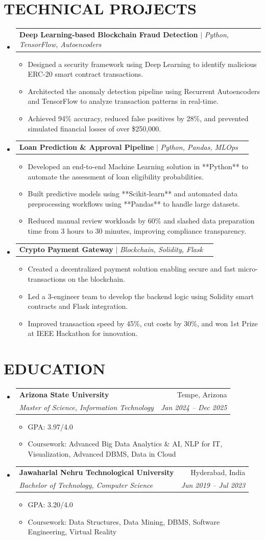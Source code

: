 \documentclass[letterpaper,10pt]{article}
\makeatletter
\newcommand{\resumeItem}[1]{\item\small{{#1 \vspace{-2pt}}}}
\newcommand{\resumeSubheading}[4]{
  \vspace{-1pt}\item
    \begin{tabular*}{0.97\textwidth}[t]{l@{\extracolsep{\fill}}r}
      \textbf{#1} & #2 \\
      \textit{\small#3} & \textit{\small #4} \\
    \end{tabular*}\vspace{-5pt}
}
\newcommand{\resumeProjectHeading}[2]{
    \item
    \begin{tabular*}{0.97\textwidth}{l@{\extracolsep{\fill}}r}
      \small#1 & #2 \\
    \end{tabular*}\vspace{-5pt}
}
\newcommand{\resumeSubHeadingListStart}{\begin{itemize}[leftmargin=0.15in, label={}]}
\newcommand{\resumeSubHeadingListEnd}{\end{itemize}}
\newcommand{\resumeItemListStart}{\begin{itemize}}
\newcommand{\resumeItemListEnd}{\end{itemize}\vspace{-5pt}}
\makeatother
\begin{document}
\section{TECHNICAL PROJECTS}
\resumeSubHeadingListStart
\resumeProjectHeading{\textbf{Deep Learning-based Blockchain Fraud Detection} $|$ \emph{Python, TensorFlow, Autoencoders}}{} \resumeItemListStart \resumeItem{Designed a security framework using Deep Learning to identify malicious ERC-20 smart contract transactions.}
\resumeItem{Architected the anomaly detection pipeline using Recurrent Autoencoders and TensorFlow to analyze transaction patterns in real-time.}
\resumeItem{Achieved 94\% accuracy, reduced false positives by 28\%, and prevented simulated financial losses of over \$250,000.}
 \resumeItemListEnd\resumeProjectHeading{\textbf{Loan Prediction \& Approval Pipeline} $|$ \emph{Python, Pandas, MLOps}}{} \resumeItemListStart \resumeItem{Developed an end-to-end Machine Learning solution in **Python** to automate the assessment of loan eligibility probabilities.}
\resumeItem{Built predictive models using **Scikit-learn** and automated data preprocessing workflows using **Pandas** to handle large datasets.}
\resumeItem{Reduced manual review workloads by 60\% and slashed data preparation time from 3 hours to 30 minutes, improving compliance transparency.}
 \resumeItemListEnd\resumeProjectHeading{\textbf{Crypto Payment Gateway} $|$ \emph{Blockchain, Solidity, Flask}}{} \resumeItemListStart \resumeItem{Created a decentralized payment solution enabling secure and fast micro-transactions on the blockchain.}
\resumeItem{Led a 3-engineer team to develop the backend logic using Solidity smart contracts and Flask integration.}
\resumeItem{Improved transaction speed by 45\%, cut costs by 30\%, and won 1st Prize at IEEE Hackathon for innovation.}
 \resumeItemListEnd
\resumeSubHeadingListEnd

\section{EDUCATION}
\resumeSubHeadingListStart
\resumeSubheading{Arizona State University}{Tempe, Arizona}{Master of Science, Information Technology}{Jan 2024 -- Dec 2025} \resumeItemListStart \resumeItem{GPA: 3.97/4.0} \resumeItem{Coursework: Advanced Big Data Analytics \& AI, NLP for IT, Visualization, Advanced DBMS, Data in Cloud} \resumeItemListEnd\resumeSubheading{Jawaharlal Nehru Technological University}{Hyderabad, India}{Bachelor of Technology, Computer Science}{Jun 2019 -- Jul 2023} \resumeItemListStart \resumeItem{GPA: 3.20/4.0} \resumeItem{Coursework: Data Structures, Data Mining, DBMS, Software Engineering, Virtual Reality} \resumeItemListEnd
\resumeSubHeadingListEnd
\end{document}
